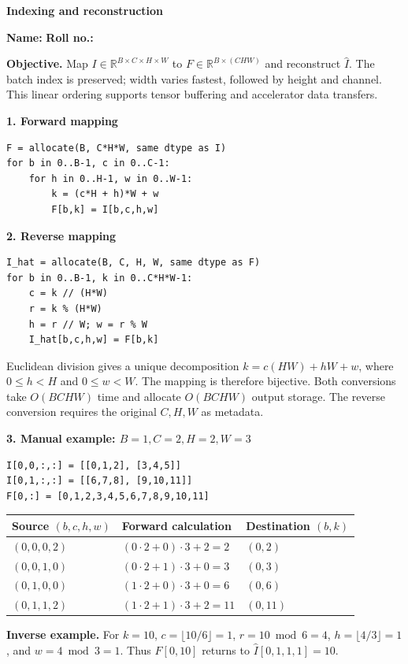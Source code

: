 \documentclass[11pt,a4paper]{article}
\newcommand{\reporttitle}[1]{{\LARGE\sffamily\bfseries\color{navy}#1}\par\medskip}
\newcommand{\reportsection}[1]{{\large\sffamily\bfseries\color{teal}#1}\par}
\newcommand{\StudentName}{}
\newcommand{\RollNumber}{}
\newcommand{\EmptyIdentity}{}
\begin{document}
\reporttitle{Indexing and reconstruction}
\ifx\StudentName\EmptyIdentity\else\textbf{Name:} \StudentName\quad\fi
\ifx\RollNumber\EmptyIdentity\else\textbf{Roll no.:} \RollNumber\par\fi
\textbf{Objective.} Map $I\in\mathbb{R}^{B\times C\times H\times W}$ to
$F\in\mathbb{R}^{B\times(CHW)}$ and reconstruct $\widehat I$.
The batch index is preserved; width varies fastest, followed by height and channel.
This linear ordering supports tensor buffering and accelerator data transfers.

\reportsection{1. Forward mapping}
\begin{lstlisting}
F = allocate(B, C*H*W, same dtype as I)
for b in 0..B-1, c in 0..C-1:
    for h in 0..H-1, w in 0..W-1:
        k = (c*H + h)*W + w
        F[b,k] = I[b,c,h,w]
\end{lstlisting}
\reportsection{2. Reverse mapping}
\begin{lstlisting}
I_hat = allocate(B, C, H, W, same dtype as F)
for b in 0..B-1, k in 0..C*H*W-1:
    c = k // (H*W)
    r = k % (H*W)
    h = r // W; w = r % W
    I_hat[b,c,h,w] = F[b,k]
\end{lstlisting}
Euclidean division gives a unique decomposition $k=c(HW)+hW+w$, where
$0\leq h<H$ and $0\leq w<W$. The mapping is therefore bijective.
Both conversions take $O(BCHW)$ time and allocate $O(BCHW)$ output storage.
The reverse conversion requires the original $C,H,W$ as metadata.

\reportsection{3. Manual example: $B=1, C=2, H=2, W=3$}
\begin{lstlisting}
I[0,0,:,:] = [[0,1,2], [3,4,5]]
I[0,1,:,:] = [[6,7,8], [9,10,11]]
F[0,:] = [0,1,2,3,4,5,6,7,8,9,10,11]
\end{lstlisting}
\begin{center}
\begin{tabular}{lll}
\toprule
Source $(b,c,h,w)$ & Forward calculation & Destination $(b,k)$ \\
\midrule
$(0,0,0,2)$ & $(0\cdot2+0)\cdot3+2=2$ & $(0,2)$ \\
$(0,0,1,0)$ & $(0\cdot2+1)\cdot3+0=3$ & $(0,3)$ \\
$(0,1,0,0)$ & $(1\cdot2+0)\cdot3+0=6$ & $(0,6)$ \\
$(0,1,1,2)$ & $(1\cdot2+1)\cdot3+2=11$ & $(0,11)$ \\
\bottomrule
\end{tabular}
\end{center}
\textbf{Inverse example.} For $k=10$, $c=\lfloor10/6\rfloor=1$,
$r=10\bmod6=4$, $h=\lfloor4/3\rfloor=1$, and $w=4\bmod3=1$.
Thus $F[0,10]$ returns to $\widehat I[0,1,1,1]=10$.
\end{document}
